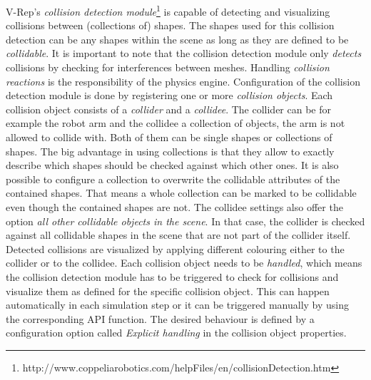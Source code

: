 V-Rep's \emph{collision detection module}\footnote{http://www.coppeliarobotics.com/helpFiles/en/collisionDetection.htm} is capable of detecting and visualizing collisions between (collections of) shapes. The shapes used for this collision detection can be any shapes within the scene as long as they are defined to be \emph{collidable}. It is important to note that the collision detection module only \textit{detects} collisions by checking for interferences between meshes. Handling \emph{collision reactions} is the responsibility of the  physics engine. Configuration of the collision detection module is done by registering one or more \emph{collision objects}. Each collision object consists of a \emph{collider} and a \emph{collidee}. The collider can be for example the robot arm and the collidee a collection of objects, the arm is not allowed to collide with. Both of them can be single shapes or collections of shapes. The big advantage in using collections is that they allow to exactly describe which shapes should be checked against which other ones. It is also possible to configure a collection to overwrite the collidable attributes of the contained shapes. That means a whole collection can be marked to be collidable even though the contained shapes are not. The collidee settings also offer the option \emph{all other collidable objects in the scene}. In that case, the collider is checked against all collidable shapes in the scene that are not part of the collider itself. Detected collisions are visualized by applying different colouring either to the collider or to the collidee. Each collision object needs to be \emph{handled}, which means the collision detection module has to be triggered to check for collisions and visualize them as defined for the specific collision object. This can happen automatically in each simulation step or it can be triggered manually by using the corresponding API function. The desired behaviour is defined by a configuration option called \emph{Explicit handling} in the collision object properties. \\


